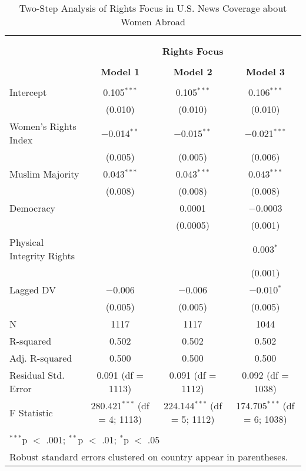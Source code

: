 
\begin{table}[!htbp] \centering 
  \caption{Two-Step Analysis of Rights Focus in U.S. News Coverage about Women Abroad} 
  \label{} 
\begin{tabular}{@{\extracolsep{5pt}}lccc} 
\\[-1.8ex]\hline \\[-1.8ex] 
\\[-1.8ex] & \multicolumn{3}{c}{\textbf{Rights Focus}} \\ 
\\[-1.8ex] & \textbf{Model 1} & \textbf{Model 2} & \textbf{Model 3}\\ 
\hline \\[-1.8ex] 
 Intercept & 0.105$^{***}$ & 0.105$^{***}$ & 0.106$^{***}$ \\ 
  & (0.010) & (0.010) & (0.010) \\ 
  Women's Rights Index & $-$0.014$^{**}$ & $-$0.015$^{**}$ & $-$0.021$^{***}$ \\ 
  & (0.005) & (0.005) & (0.006) \\ 
  Muslim Majority & 0.043$^{***}$ & 0.043$^{***}$ & 0.043$^{***}$ \\ 
  & (0.008) & (0.008) & (0.008) \\ 
  Democracy &  & 0.0001 & $-$0.0003 \\ 
  &  & (0.0005) & (0.001) \\ 
  Physical Integrity Rights &  &  & 0.003$^{*}$ \\ 
  &  &  & (0.001) \\ 
  Lagged DV & $-$0.006 & $-$0.006 & $-$0.010$^{*}$ \\ 
  & (0.005) & (0.005) & (0.005) \\ 
 N & 1117 & 1117 & 1044 \\ 
R-squared & 0.502 & 0.502 & 0.502 \\ 
Adj. R-squared & 0.500 & 0.500 & 0.500 \\ 
Residual Std. Error & 0.091 (df = 1113) & 0.091 (df = 1112) & 0.092 (df = 1038) \\ 
F Statistic & 280.421$^{***}$ (df = 4; 1113) & 224.144$^{***}$ (df = 5; 1112) & 174.705$^{***}$ (df = 6; 1038) \\ 
\hline \\[-1.8ex] 
\multicolumn{4}{l}{$^{***}$p $<$ .001; $^{**}$p $<$ .01; $^{*}$p $<$ .05} \\ 
\multicolumn{4}{l}{Robust standard errors clustered on country appear in parentheses.} \\ 
\end{tabular} 
\end{table} 
